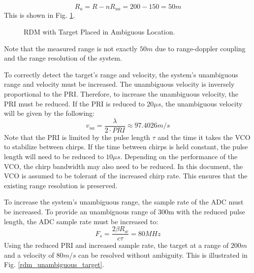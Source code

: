 \documentclass[conference]{IEEEtran}
\begin{document}
\begin{equation}
R_a = R - nR_{ua} = 200 - 150 = 50m
\end{equation}
This is shown in Fig. \ref{rdm_ambiguous_target}.
\begin{figure}[H]
\centerline{}
\caption{RDM with Target Placed in Ambiguous Location.}
\label{rdm_ambiguous_target}
\end{figure}
\noindent
Note that the measured range is not exactly $50m$ due to range-doppler coupling and the range resolution of the system.
\par
To correctly detect the target's range and velocity, the system's unambiguous range and velocity must be increased. The unambiguous velocity is inversely proportional to the PRI. Therefore, to increase the unambiguous velocity, the PRI must be reduced. If the PRI is reduced to $20\mu s$, the unambiguous velocity will be given by the following:
\begin{equation}
v_{ua} = \frac{\lambda}{2\cdot PRI} \approx 97.4026 m/s
\end{equation}
Note that the PRI is limited by the pulse length $\tau$ and the time it takes the VCO to stabilize between chirps. If the time between chirps is held constant, the pulse length will need to be reduced to $10\mu s$. Depending on the performance of the VCO, the chirp bandwidth may also need to be reduced. In this document, the VCO is assumed to be tolerant of the increased chirp rate. This ensures that the existing range resolution is preserved.
\par
To increase the system's unambiguous range, the sample rate of the ADC must be increased. To provide an unambiguous range of 300m with the reduced pulse length, the ADC sample rate must be increased to:
\begin{equation}
F_s = \frac{2\beta R_w}{c\tau} = 80MHz 
\end{equation}
Using the reduced PRI and increased sample rate, the target at a range of $200m$ and a velocity of $80m/s$ can be resolved without ambiguity. This is illustrated in Fig. \ref{rdm_unambiguous_target}.
\end{document}
